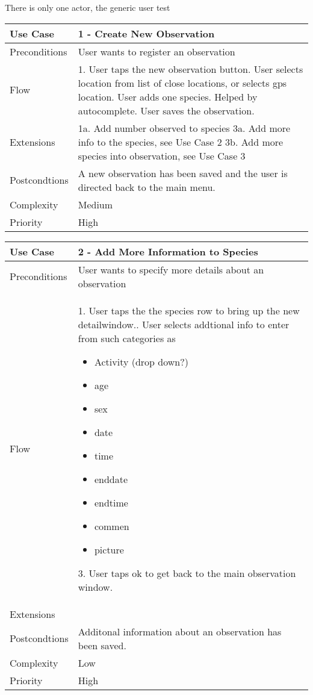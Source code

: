 There is only one actor, the generic user test

\begin{tabular}[t]{|l|p{}|}\hline
Use Case&1 - Create New Observation\\\hline
Preconditions&User wants to register an observation\\\hline
Flow&1. User taps the new observation button\newline
2. User selects location from list of close locations, or selects gps location\newline
3. User adds one species. Helped by autocomplete\newline
4. User saves the observation.\\\hline
Extensions& 1a. Add number observed to species\newline
3a. Add more info to the species, see Use Case 2\newline
3b. Add more species into observation, see Use Case 3\\\hline
Postcondtions&A new observation has been saved and the user is directed back to the main menu.\\\hline
Complexity&Medium\\\hline
Priority&High\\\hline
\end{tabular}
\newline
\begin{tabular}[t]{|l|p{}|}\hline
Use Case&2 - Add More Information to Species\\\hline
Preconditions&User wants to specify more details about an observation\\\hline
Flow& 1. User taps the the species row to bring up the new detailwindow.\newline
2. User selects addtional info to enter from such categories as 
	\begin{itemize}
		\item Activity (drop down?)
		\item age
		\item sex
		\item date
		\item time
		\item enddate
		\item endtime
		\item commen
		\item picture
\end{itemize}
3. User taps ok to get back to the main observation window.\\\hline
Extensions& \\\hline
Postcondtions&Additonal information about an observation has been saved.\\\hline
Complexity&Low\\\hline
Priority&High\\\hline
\end{tabular}

